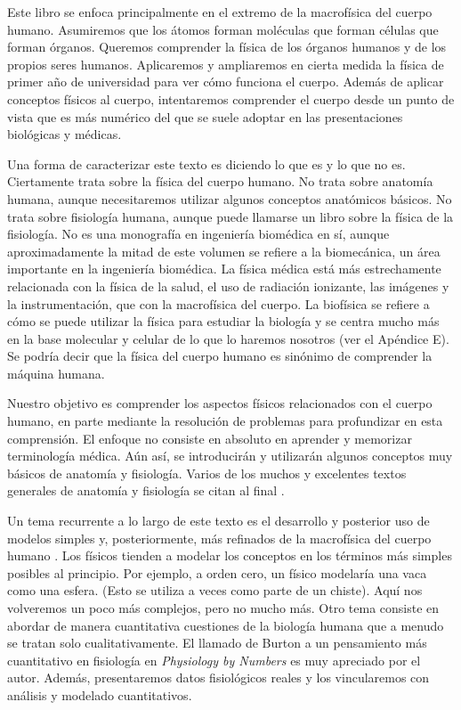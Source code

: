 ﻿\documentclass{book}
\begin{document}
Este libro se enfoca principalmente en el extremo de la macrofísica del cuerpo humano. Asumiremos que los átomos forman moléculas que forman células que forman órganos. Queremos comprender la física de los órganos humanos y de los propios seres humanos. Aplicaremos y ampliaremos en cierta medida la física de primer año de universidad para ver cómo funciona el cuerpo. Además de aplicar conceptos físicos al cuerpo, intentaremos comprender el cuerpo desde un punto de vista que es más numérico del que se suele adoptar en las presentaciones biológicas y médicas.

Una forma de caracterizar este texto es diciendo lo que es y lo que no es. Ciertamente trata sobre la física del cuerpo humano. No trata sobre anatomía humana, aunque necesitaremos utilizar algunos conceptos anatómicos básicos. No trata sobre fisiología humana, aunque puede llamarse un libro sobre la física de la fisiología. No es una monografía en ingeniería biomédica en sí, aunque aproximadamente la mitad de este volumen se refiere a la biomecánica, un área importante en la ingeniería biomédica. La física médica está más estrechamente relacionada con la física de la salud, el uso de radiación ionizante, las imágenes y la instrumentación, que con la macrofísica del cuerpo. La biofísica se refiere a cómo se puede utilizar la física para estudiar la biología y se centra mucho más en la base molecular y celular de lo que lo haremos nosotros (ver el Apéndice E). Se podría decir que la física del cuerpo humano es sinónimo de comprender la máquina humana.

Nuestro objetivo es comprender los aspectos físicos relacionados con el cuerpo humano, en parte mediante la resolución de problemas para profundizar en esta comprensión. El enfoque no consiste en absoluto en aprender y memorizar terminología médica. Aún así, se introducirán y utilizarán algunos conceptos muy básicos de anatomía y fisiología. Varios de los muchos y excelentes textos generales de anatomía y fisiología se citan al final \cite{1st-11, 1st-16, 1st-21, 1st-22, 1st-23, 1st-24, 1st-25, 1st-26, 1st-27, 1st-29}.

Un tema recurrente a lo largo de este texto es el desarrollo y posterior uso de modelos simples y, posteriormente, más refinados de la macrofísica del cuerpo humano \cite{1st-7, 1st-13, 1st-15}. Los físicos tienden a modelar los conceptos en los términos más simples posibles al principio. Por ejemplo, a orden cero, un físico modelaría una vaca como una esfera. (Esto se utiliza a veces como parte de un chiste). Aquí nos volveremos un poco más complejos, pero no mucho más. Otro tema consiste en abordar de manera cuantitativa cuestiones de la biología humana que a menudo se tratan solo cualitativamente. El llamado de Burton a un pensamiento más cuantitativo en fisiología en \textit{Physiology by Numbers} \cite{1st-5} es muy apreciado por el autor. Además, presentaremos datos fisiológicos reales y los vincularemos con análisis y modelado cuantitativos.
\end{document}
